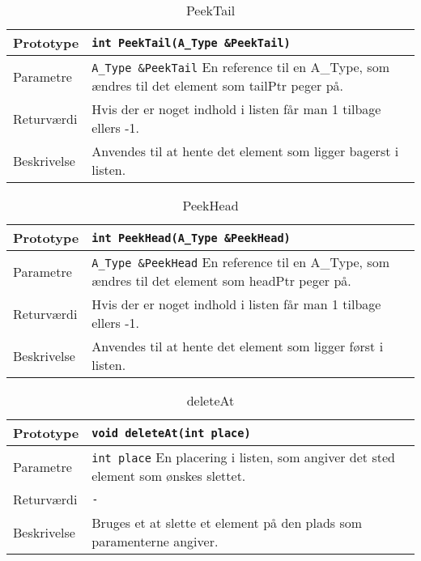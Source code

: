 \begin{table}[h]
\begin{tabularx}{\textwidth}{| >{\raggedright\arraybackslash}p{2.5 cm} | >{\raggedright\arraybackslash}X |} \hline
Prototype & \texttt{int PeekTail(A\_Type \&PeekTail)} \\\hline
Parametre & \texttt{A\_Type \&PeekTail} \newline
En reference til en A\_Type, som ændres til det element som tailPtr peger på. \\\hline
Returværdi & Hvis der er noget indhold i listen får man 1 tilbage ellers -1. \\\hline
Beskrivelse & Anvendes til at hente det element som ligger bagerst i listen. \\\hline
\end{tabularx}
\caption{PeekTail}
\label{table:PeekTail}
\end{table}


\begin{table}[h]
\begin{tabularx}{\textwidth}{| >{\raggedright\arraybackslash}p{2.5 cm} | >{\raggedright\arraybackslash}X |} \hline
Prototype & \texttt{int PeekHead(A\_Type \&PeekHead)} \\\hline
Parametre & \texttt{A\_Type \&PeekHead} \newline
En reference til en A\_Type, som ændres til det element som headPtr peger på. \\\hline
Returværdi & Hvis der er noget indhold i listen får man 1 tilbage ellers -1. \\\hline
Beskrivelse & Anvendes til at hente det element som ligger først i listen. \\\hline
\end{tabularx}
\caption{PeekHead}
\label{table:PeekHead}
\end{table}


\begin{table}[h]
\begin{tabularx}{\textwidth}{| >{\raggedright\arraybackslash}p{2.5 cm} | >{\raggedright\arraybackslash}X |} \hline
Prototype & \texttt{void deleteAt(int place)} \\\hline
Parametre & \texttt{int place} \newline
En placering i listen, som angiver det sted element som ønskes slettet. \\\hline
Returværdi & \texttt{-} \\\hline
Beskrivelse & Bruges et at slette et element på den plads som paramenterne angiver. \\\hline
\end{tabularx}
\caption{deleteAt}
\label{table:deleteAt}
\end{table}


